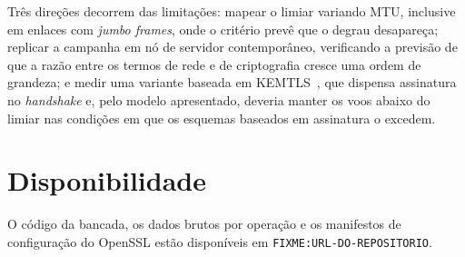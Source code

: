 \documentclass[conference]{IEEEtran}
\begin{document}
Três direções decorrem das limitações: mapear o limiar variando MTU, inclusive em
enlaces com \textit{jumbo frames}, onde o critério prevê que o degrau desapareça;
replicar a campanha em nó de servidor contemporâneo, verificando a previsão de
que a razão entre os termos de rede e de criptografia cresce uma ordem de
grandeza; e medir uma variante baseada em KEMTLS~\cite{schwabe2020kemtls}, que
dispensa assinatura no \textit{handshake} e, pelo modelo apresentado, deveria
manter os voos abaixo do limiar nas condições em que os esquemas baseados em
assinatura o excedem.

\section*{Disponibilidade}
O código da bancada, os dados brutos por operação e os manifestos de configuração
do OpenSSL estão disponíveis em \texttt{FIXME:URL-DO-REPOSITORIO}.



\end{document}
